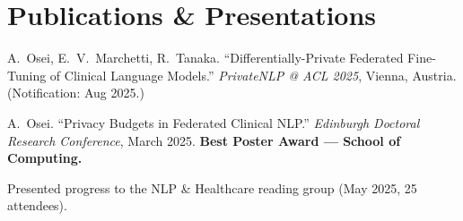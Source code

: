 \section{Publications \& Presentations}

\begin{description}[leftmargin=0pt, labelindent=0pt, itemsep=3pt, topsep=2pt]
  \item[\textcolor{accent}{Workshop paper (under review)}]
        A.~Osei, E.~V.~Marchetti, R.~Tanaka.
        ``Differentially-Private Federated Fine-Tuning of Clinical Language Models.''
        \textit{PrivateNLP @ ACL 2025}, Vienna, Austria. (Notification: Aug 2025.)

  \item[\textcolor{accent}{Poster}]
        A.~Osei. ``Privacy Budgets in Federated Clinical NLP.''
        \textit{Edinburgh Doctoral Research Conference}, March 2025.
        \textbf{Best Poster Award — School of Computing.}

  \item[\textcolor{accent}{Internal seminar}]
        Presented progress to the NLP \& Healthcare reading group (May 2025, 25 attendees).
\end{description}

